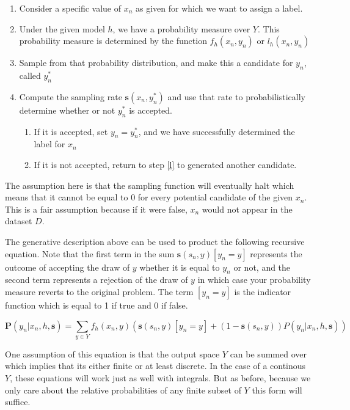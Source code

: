 \documentclass[twoside]{article}
\begin{document}
\begin{enumerate}
	\item Consider a specific value of \(x_n\) as given for which we want to assign a label.
	\item Under the given model \(h\), we have a probability measure over \(Y\). This probability measure is determined by the function \(f_h(x_n,y_n)\) or \(l_h(x_n,y_n)\)
	\item \label{l} Sample from that probability distribution, and make this a candidate for \(y_n\), called \(y_n^*\)
	\item Compute the sampling rate \(\mathbf{s}(x_n,y_n^*)\) and use that rate to probabilistically determine whether or not \(y_n^*\) is accepted.
    \begin{enumerate}
    	  \item If it is accepted, set \(y_n=y_n^*\), and we have successfully determined the label for \(x_n\)
        \item If it is not accepted, return to step \ref{l} to generated another candidate.
    \end{enumerate}
\end{enumerate}

The assumption here is that the sampling function will eventually halt which means that it cannot be equal to 0 for every potential candidate of the given \(x_n\). This is a fair assumption because if it were false, \(x_n\) would not appear in the dataset \(D\).

The generative description above can be used to product the following recursive equation. Note that the first term in the sum \(\mathbf{s}(s_n,y)\left [y_n = y\right ]\) represents the outcome of accepting the draw of \(y\) whether it is equal to \(y_n\) or not, and the second term represents a rejection of the draw of \(y\) in which case your probability measure reverts to the original problem. The term \(\left [y_n = y\right ]\) is the indicator function which is equal to 1 if true and 0 if false.

\[\mathbf{P}(y_n|x_n,h,\mathbf{s})=\sum_{y \in Y}f_h(x_n,y)\left(\mathbf{s}(s_n,y)\left [y_n = y\right ] + (1-\mathbf{s}(s_n,y))P(y_n|x_n,h,\mathbf{s})\right)\]

One assumption of this equation is that the output space \(Y\) can be summed over which implies that its either finite or at least discrete. In the case of a continous \(Y\), these equations will work just as well with integrals. But as before, because we only care about the relative probabilities of any finite subset of \(Y\) this form will suffice.
\end{document}
